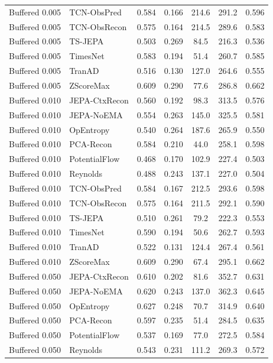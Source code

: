 \begin{table}[t]
\begin{tabular}{@{}llccccc@{}}
Buffered 0.005 & TCN-ObsPred & 0.584 & 0.166 & 214.6 & 291.2 & 0.596 \\
Buffered 0.005 & TCN-ObsRecon & 0.575 & 0.164 & 214.5 & 289.6 & 0.583 \\
Buffered 0.005 & TS-JEPA & 0.503 & 0.269 & 84.5 & 216.3 & 0.536 \\
Buffered 0.005 & TimesNet & 0.583 & 0.194 & 51.4 & 260.7 & 0.585 \\
Buffered 0.005 & TranAD & 0.516 & 0.130 & 127.0 & 264.6 & 0.555 \\
Buffered 0.005 & ZScoreMax & 0.609 & 0.290 & 77.6 & 286.8 & 0.662 \\
Buffered 0.010 & JEPA-CtxRecon & 0.560 & 0.192 & 98.3 & 313.5 & 0.576 \\
Buffered 0.010 & JEPA-NoEMA & 0.554 & 0.263 & 145.0 & 325.5 & 0.581 \\
Buffered 0.010 & OpEntropy & 0.540 & 0.264 & 187.6 & 265.9 & 0.550 \\
Buffered 0.010 & PCA-Recon & 0.584 & 0.210 & 44.0 & 258.1 & 0.598 \\
Buffered 0.010 & PotentialFlow & 0.468 & 0.170 & 102.9 & 227.4 & 0.503 \\
Buffered 0.010 & Reynolds & 0.488 & 0.243 & 137.1 & 227.0 & 0.504 \\
Buffered 0.010 & TCN-ObsPred & 0.584 & 0.167 & 212.5 & 293.6 & 0.598 \\
Buffered 0.010 & TCN-ObsRecon & 0.575 & 0.164 & 211.5 & 292.1 & 0.590 \\
Buffered 0.010 & TS-JEPA & 0.510 & 0.261 & 79.2 & 222.3 & 0.553 \\
Buffered 0.010 & TimesNet & 0.590 & 0.194 & 50.6 & 262.7 & 0.593 \\
Buffered 0.010 & TranAD & 0.522 & 0.131 & 124.4 & 267.4 & 0.561 \\
Buffered 0.010 & ZScoreMax & 0.609 & 0.290 & 67.4 & 295.1 & 0.662 \\
Buffered 0.050 & JEPA-CtxRecon & 0.610 & 0.202 & 81.6 & 352.7 & 0.631 \\
Buffered 0.050 & JEPA-NoEMA & 0.620 & 0.243 & 137.0 & 362.3 & 0.645 \\
Buffered 0.050 & OpEntropy & 0.627 & 0.248 & 70.7 & 314.9 & 0.640 \\
Buffered 0.050 & PCA-Recon & 0.597 & 0.235 & 51.4 & 284.5 & 0.635 \\
Buffered 0.050 & PotentialFlow & 0.537 & 0.169 & 77.0 & 272.5 & 0.584 \\
Buffered 0.050 & Reynolds & 0.543 & 0.231 & 111.2 & 269.3 & 0.572 \\

\end{tabular}
\end{table}
